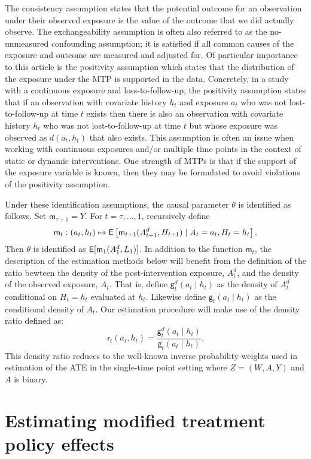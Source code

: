 \documentclass[]{jss}
\newcommand{\Q}{\mathsf{m}}
\renewcommand{\r}{\mathsf{r}}
\newcommand{\g}{\mathsf{g}}
\begin{document}
The consistency assumption states that the potential outcome for an
observation under their observed exposure is the value of the outcome
that we did actually observe. The
exchangeability assumption is often also referred to as the
no-unmeasured confounding assumption; it is satisfied if all common
causes of the exposure and outcome are measured and adjusted for. Of
particular importance to this article is the positivity assumption
which states that the distribution of the exposure under the MTP is
supported in the data. Concretely, in a study with a continuous
exposure and loss-to-follow-up, the positivity assumption states that
if an observation with covariate history \(h_t\) and exposure \(a_t\)
who was not lost-to-follow-up at time \(t\) exists then there is also
an observation with covariate history \(h_t\) who was not
lost-to-follow-up at time \(t\) but whose exposure was observed as
\(d(a_t, h_t)\) that also exists. This assumption is
often an issue when working with continuous exposures and/or multiple
time points in the context of static or dynamic interventions. One
strength of MTPs is that if the support of the exposure variable is known,
then they may be formulated to avoid violations of the positivity
assumption.%

Under these identification assumptions, the causal parameter $\theta$
is identified as follows. Set $\Q_{\tau+1}= Y$. For $t=\tau,\ldots,1$,
recursively define
\begin{equation}
  \Q_t:(a_t, h_t) \mapsto \E\left[\Q_{t+1}(A_{t+1}^d, H_{t+1})\mid
    A_t=a_t, H_t=h_t\right].\label{eq:defQ}
\end{equation} Then $\theta$ is identified as
$\E[\Q_1(A_1^d, L_1)]$.
In addition to the function $\Q_t$, the description of the estimation
methods below will benefit from the definition of the ratio bewteen
the density of the post-intervention exposure, $A_t^d$, and the
density of the observed exposure, $A_t$. That is, define $\g_t^d(a_t\mid
h_t)$ as the density of $A_t^d$ conditional on $H_t=h_t$ evaluated at
$h_t$. Likewise define $\g_t(a_t\mid h_t)$ as the conditional density
of $A_t$. Our estimation procedure will make use of the density ratio
defined as:
\[\r_t(a_t, h_t) = \frac{\g_t^d(a_t\mid
    h_t)}{\g_t(a_t\mid h_t)}.\]
This density ratio reduces to the well-known inverse probability
weights used in estimation of the ATE in the single-time point setting
where $Z=(W,A,Y)$ and $A$ is binary.

\hypertarget{estimating-modified-treatment-policy-effects}{%
\section{Estimating modified treatment policy
effects}\label{estimating-modified-treatment-policy-effects}}
\end{document}

